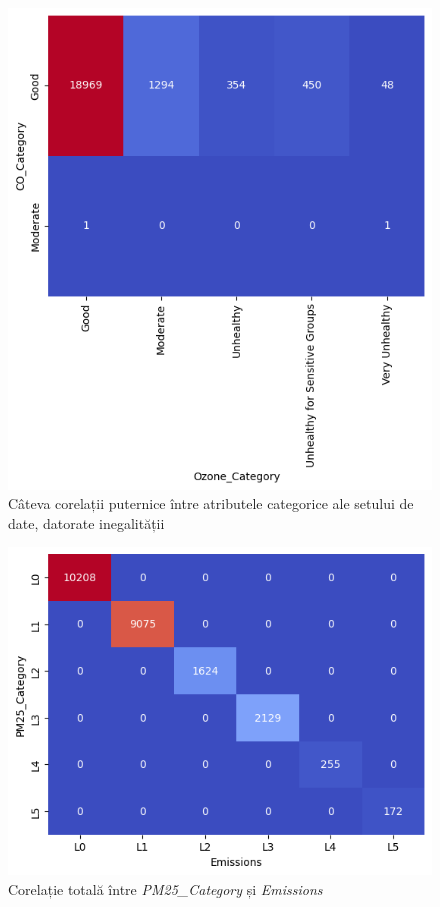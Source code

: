 \documentclass{article}
\begin{document}
\begin{figure}[htb]
    \includegraphics[scale=0.5]{air_pollution/analysis/correlation/co-o3.png}
    \caption{Câteva corelații puternice între atributele categorice ale setului 
    de date, datorate inegalității}
    \label{fig:pol:cont}
\end{figure}

\begin{figure}[htb]
    \centering
    \includegraphics[scale=0.5]{air_pollution/analysis/correlation/pm25-emissions.png}
    \caption{Corelație totală între \textit{PM25\_Category} și 
    \textit{Emissions}}
    \label{fig:pol:cont_tot}
\end{figure}
\end{document}
